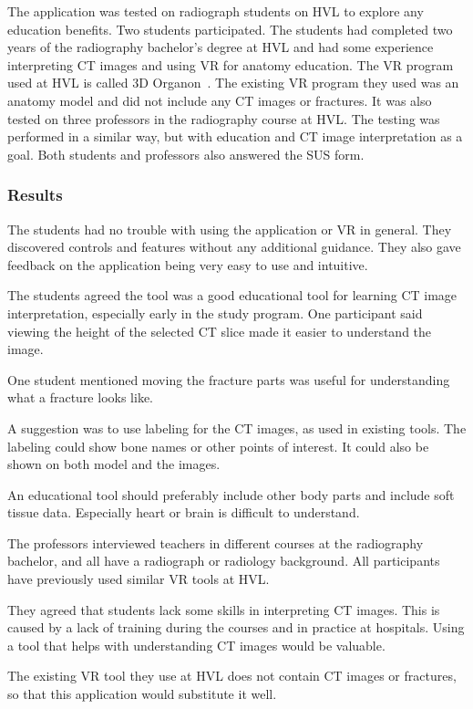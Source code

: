 \documentclass[a4paper]{report}
\begin{document}
The application was tested on radiograph students on HVL to explore any education benefits. Two students participated. The students had completed two years of the radiography bachelor's degree at HVL and had some experience interpreting CT images and using VR for anatomy education. The VR program used at HVL is called 3D Organon~\cite{organon_3d_nodate}.
The existing VR program they used was an anatomy model and did not include any CT images or fractures.
It was also tested on three professors in the radiography course at HVL.
The testing was performed in a similar way, but with education and CT image interpretation as a goal.
Both students and professors also answered the SUS form.

\subsubsection{Results}
The students had no trouble with using the application or VR in general. They discovered controls and features without any additional guidance. They also gave feedback on the application being very easy to use and intuitive.

The students agreed the tool was a good educational tool for learning CT image interpretation, especially early in the study program.
One participant said viewing the height of the selected CT slice made it easier to understand the image.

One student mentioned moving the fracture parts was useful for understanding what a fracture looks like.

A suggestion was to use labeling for the CT images, as used in existing tools. The labeling could show bone names or other points of interest. It could also be shown on both model and the images.

An educational tool should preferably include other body parts and include soft tissue data. Especially heart or brain is difficult to understand.


The professors interviewed teachers in different courses at the radiography bachelor, and all have a radiograph or radiology background. 
All participants have previously used similar VR tools at HVL.

They agreed that students lack some skills in interpreting CT images. This is caused by a lack of training during the courses and in practice at hospitals. Using a tool that helps with understanding CT images would be valuable. 

The existing VR tool they use at HVL does not contain CT images or fractures, so that this application would substitute it well.
\end{document}
